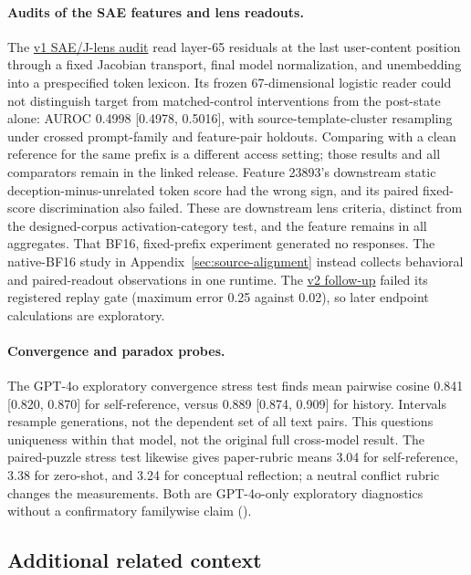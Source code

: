 \documentclass[11pt]{article}
\newcommand{\artifact}[2]{\href{https://github.com/tdj28/llm_selfref_pre/blob/f5e906e1737bc71bf20b642af1d698018eec82fe/#1}{#2}}
\begin{document}
\paragraph{Audits of the SAE features and lens readouts.}
The \artifact{data/sae_jlens_audit/confirmatory_v1_20260711/}{v1 SAE/J-lens audit} read
layer-65 residuals at the last user-content position through a fixed Jacobian
transport, final model normalization, and unembedding into a prespecified
token lexicon. Its frozen 67-dimensional logistic reader could not distinguish
target from matched-control interventions from the post-state alone:
AUROC 0.4998 [0.4978, 0.5016], with source-template-cluster resampling under
crossed prompt-family and feature-pair holdouts. Comparing with a clean
reference for the same prefix is a different access setting; those results
and all comparators remain in the linked release. Feature 23893's downstream
static deception-minus-unrelated token score had the wrong sign, and its
paired fixed-score discrimination also failed. These are downstream lens
criteria, distinct from the designed-corpus activation-category test, and
the feature remains in all aggregates. That BF16, fixed-prefix experiment
generated no responses. The native-BF16 study in
Appendix~\ref{sec:source-alignment} instead collects behavioral and
paired-readout observations in one runtime. The
\artifact{data/sae_jlens_audit/confirmatory_v2_20260712/}{v2 follow-up} failed its
registered replay gate (maximum error 0.25 against 0.02), so later endpoint
calculations are exploratory.

\paragraph{Convergence and paradox probes.}
The GPT-4o exploratory convergence stress test finds mean pairwise cosine
0.841 [0.820, 0.870] for self-reference, versus 0.889 [0.874, 0.909] for
history. Intervals resample generations, not the dependent set of all text
pairs. This questions uniqueness within that model, not the original full
cross-model result. The paired-puzzle stress test likewise gives paper-rubric
means 3.04 for self-reference, 3.38 for zero-shot, and 3.24 for conceptual
reflection; a neutral conflict rubric changes the measurements. Both are
GPT-4o-only exploratory diagnostics without a confirmatory familywise claim
().
\FloatBarrier
\subsection{Additional related context}
\label{app:related-context}
\end{document}
